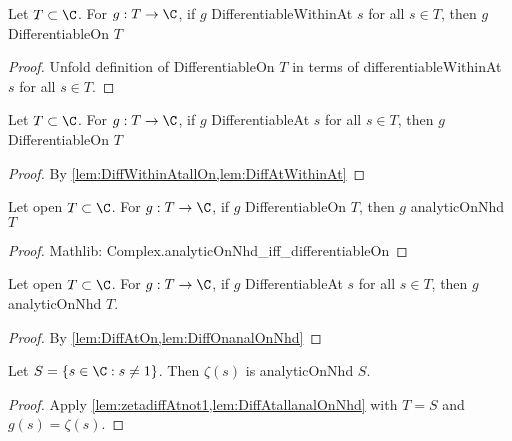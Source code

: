 \begin{lemma}[Within to on]\label{lem:DiffWithinAtallOn}
\leanok
Let $T\subset\C$. For $g:T\to\C$, if $g$ DifferentiableWithinAt $s$ for all $s\in T$, then $g$ DifferentiableOn $T$
\end{lemma}
\begin{proof}
\leanok
Unfold definition of DifferentiableOn $T$ in terms of differentiableWithinAt $s$ for all $s\in T$.
\end{proof}

\begin{lemma}[At to on]\label{lem:DiffAtOn}
\leanok
Let $T\subset\C$. For $g:T\to\C$, if $g$ DifferentiableAt $s$ for all $s\in T$, then $g$ DifferentiableOn $T$
\end{lemma}
\begin{proof}
\leanok
{}
By \cref{lem:DiffWithinAtallOn,lem:DiffAtWithinAt}
\end{proof}



\begin{lemma}\label{lem:DiffOnanalOnNhd}
\leanok
Let open $T\subset\C$. For $g:T\to\C$, if $g$ DifferentiableOn $T$, then $g$ analyticOnNhd $T$
\end{lemma}
\begin{proof}
\leanok
Mathlib: Complex.analyticOnNhd\_iff\_differentiableOn
\end{proof}

\begin{lemma}\label{lem:DiffAtallanalOnNhd}
\leanok
Let open $T\subset\C$. For $g:T\to\C$, if $g$ DifferentiableAt $s$ for all $s\in T$, then $g$ analyticOnNhd $T$.
\end{lemma}
\begin{proof}
\leanok
{}
By \cref{lem:DiffAtOn,lem:DiffOnanalOnNhd}
\end{proof}


\begin{lemma}\label{lem:zetaanalOnnot1}
\leanok
Let $S=\{s\in \C : s\neq 1\}$. Then $\zeta(s)$ is analyticOnNhd $S$.
\end{lemma}
\begin{proof}
\leanok
{}
Apply \cref{lem:zetadiffAtnot1,lem:DiffAtallanalOnNhd} with $T=S$ and $g(s)=\zeta(s)$.
\end{proof}


